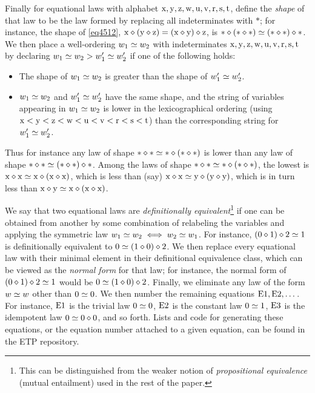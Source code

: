 Finally for equational laws with alphabet $\mathrm{x},\mathrm{y},\mathrm{z},\mathrm{w},\mathrm{u},\mathrm{v},\mathrm{r},\mathrm{s},\mathrm{t}$, define the \emph{shape} of that law to be the law formed by replacing all indeterminates with $\ast$; for instance, the shape of \eqref{eq4512}, $\mathrm{x} \diamond (\mathrm{y} \diamond \mathrm{z}) = (\mathrm{x} \diamond \mathrm{y}) \diamond \mathrm{z}$, is $\ast \diamond (\ast \diamond \ast) \simeq (\ast \diamond \ast) \diamond \ast$.  We then place a well-ordering $w_1 \simeq w_2$ with indeterminates $\mathrm{x},\mathrm{y},\mathrm{z},\mathrm{w},\mathrm{u},\mathrm{v},\mathrm{r},\mathrm{s},\mathrm{t}$ by declaring $w_1 \simeq w_2 > w'_1 \simeq w'_2$ if one of the following holds:
\begin{itemize}
\item The shape of $w_1 \simeq w_2$ is greater than the shape of $w'_1 \simeq w'_2$.
\item $w_1 \simeq w_2$ and $w'_1 \simeq w'_2$ have the same shape, and the string of variables appearing in $w_1 \simeq w_2$ is lower in the lexicographical ordering (using $\mathrm{x} < \mathrm{y} < \mathrm{z} < \mathrm{w} < \mathrm{u} < \mathrm{v} < \mathrm{r} < \mathrm{s} < \mathrm{t}$) than the corresponding string for $w'_1 \simeq w'_2$.
\end{itemize}
Thus for instance any law of shape $\ast \diamond \ast \simeq \ast \diamond (\ast \diamond \ast)$ is lower than any law of shape
$\ast \diamond \ast \simeq (\ast \diamond \ast) \diamond \ast$.  Among the laws of shape $\ast \diamond \ast \simeq \ast \diamond (\ast \diamond \ast)$, the lowest is $\mathrm{x} \diamond \mathrm{x} \simeq \mathrm{x} \diamond (\mathrm{x} \diamond \mathrm{x})$, which is less than (say) $\mathrm{x} \diamond \mathrm{x} \simeq \mathrm{y} \diamond (\mathrm{y} \diamond \mathrm{y})$, which is in turn less than $\mathrm{x} \diamond \mathrm{y} \simeq \mathrm{x} \diamond (\mathrm{x} \diamond \mathrm{x})$.

We say that two equational laws are \emph{definitionally equivalent}\footnote{This can be distinguished from the weaker notion of \emph{propositional equivalence} (mutual entailment) used in the rest of the paper.} if one can be obtained from another by some combination of relabeling the variables and applying the symmetric law $w_1 \simeq w_2 \iff w_2 \simeq w_1$.  For instance, $(0 \diamond 1) \diamond 2 \simeq 1$ is definitionally equivalent to $0 \simeq (1 \diamond 0) \diamond 2$.  We then replace every equational law with their minimal element in their definitional equivalence class, which can be viewed as the \emph{normal form} for that law; for instance, the normal form of $(0 \diamond 1) \diamond 2 \simeq 1$ would be $0 \simeq (1 \diamond 0) \diamond 2$.  Finally, we eliminate any law of the form $w \simeq w$ other than $0 \simeq 0$.  We then number the remaining equations $\mathrm{E}1, \mathrm{E}2, \dots$.  For instance, $\mathrm{E}1$ is the trivial law $0 \simeq 0$, $\mathrm{E}2$ is the constant law $0 \simeq 1$, $\mathrm{E}3$ is the idempotent law $0 \simeq 0 \diamond 0$, and so forth.  Lists and code for generating these equations, or the equation number attached to a given equation, can be found in the ETP repository.


